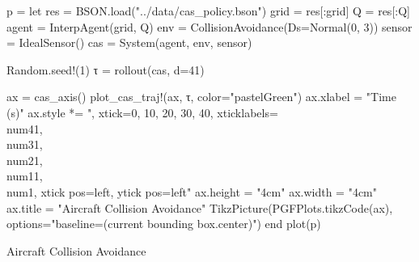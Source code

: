 \begin{jlcode}
    p = let
        res = BSON.load("../data/cas_policy.bson")
        grid = res[:grid]
        Q = res[:Q]
        agent = InterpAgent(grid, Q)
        env = CollisionAvoidance(Ds=Normal(0, 3))
        sensor = IdealSensor()
        cas = System(agent, env, sensor)

        Random.seed!(1)
        τ = rollout(cas, d=41)

        ax = cas_axis()
        plot_cas_traj!(ax, τ, color="pastelGreen")
        ax.xlabel = "Time (s)"
        ax.style *= ", xtick={0, 10, 20, 30, 40}, xticklabels={\\num{41}, \\num{31}, \\num{21}, \\num{11}, \\num{1}}, xtick pos=left, ytick pos=left"
        ax.height = "4cm"
        ax.width = "4cm"
        ax.title = "Aircraft Collision Avoidance"
        TikzPicture(PGFPlots.tikzCode(ax), options="baseline=(current bounding box.center)")
    end
    plot(p)
\end{jlcode}

\begin{frame}[fragile,t]{Aircraft Collision Avoidance}

{\small\begin{table} %
\end{table}}

\end{frame}
